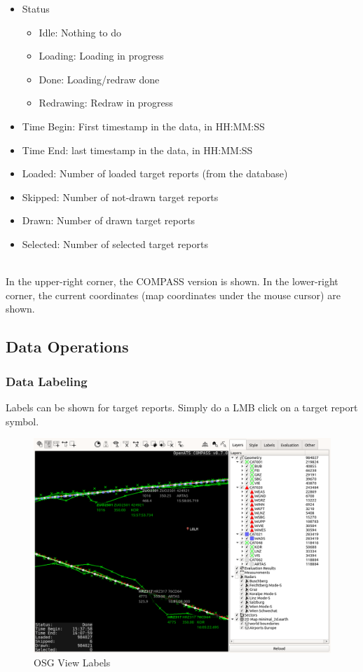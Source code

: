 \begin{itemize}
 \item Status
\begin{itemize}
 \item Idle: Nothing to do
 \item Loading: Loading in progress
 \item Done: Loading/redraw done
 \item Redrawing: Redraw in progress
\end{itemize}
 \item Time Begin: First timestamp in the data, in HH:MM:SS
 \item Time End: last timestamp in the data, in HH:MM:SS
 \item Loaded: Number of loaded target reports (from the database)
 \item Skipped: Number of not-drawn target reports
 \item Drawn: Number of drawn target reports
 \item Selected: Number of selected target reports
\end{itemize}
\  \\

In the upper-right corner, the COMPASS version is shown. In the lower-right corner, the current coordinates (map coordinates under the mouse cursor) are shown. 

\subsection{Data Operations}

\subsubsection{Data Labeling}

Labels can be shown for target reports. Simply do a LMB click on a target report symbol.

\begin{figure}[H]
    \hspace*{-2.5cm}
    \includegraphics[width=19cm,frame]{figures/osgview_labels.png}
  \caption{OSG View Labels}
\end{figure}

